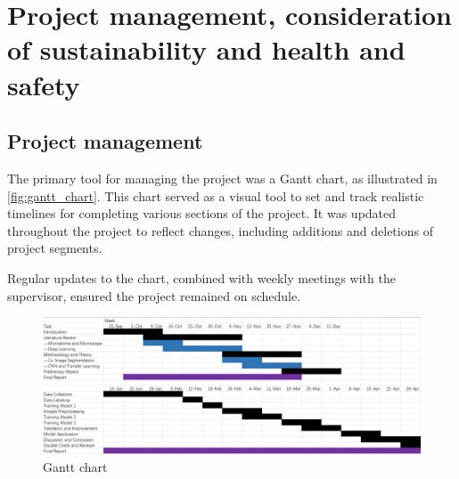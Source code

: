 \section{Project management, consideration of sustainability and health and safety}

\label{sec:conclusion}
\subsection{Project management}

The primary tool for managing the project was a Gantt chart, as illustrated in \autoref{fig:gantt_chart}. This chart served as a visual tool to set and track realistic timelines for completing various sections of the project. It was updated throughout the project to reflect changes, including additions and deletions of project segments.

Regular updates to the chart, combined with weekly meetings with the supervisor, ensured the project remained on schedule.



\begin{figure}[htbp]
    \centering
    \includegraphics[width=1\textwidth]{./fig/gantt_chart.png}
    \caption{Gantt chart}
    \label{fig:gantt_chart}
\end{figure}





